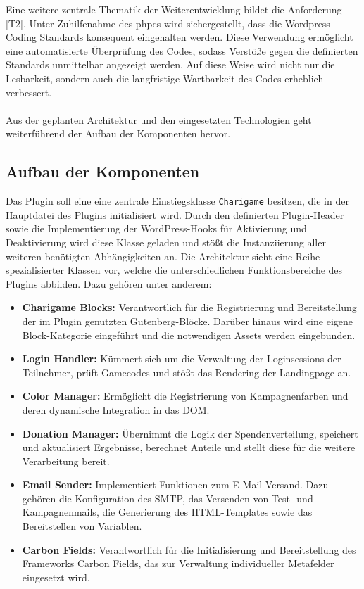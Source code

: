 Eine weitere zentrale Thematik der Weiterentwicklung bildet die Anforderung [T2].
Unter Zuhilfenahme des \gls{phpcs} wird sichergestellt, dass die Wordpress Coding Standards konsequent eingehalten werden.
Diese Verwendung ermöglicht eine automatisierte Überprüfung des Codes, sodass Verstöße gegen die definierten Standards unmittelbar angezeigt werden.
Auf diese Weise wird nicht nur die Lesbarkeit, sondern auch die langfristige Wartbarkeit des Codes erheblich verbessert.
\\\\
Aus der geplanten Architektur und den eingesetzten Technologien geht weiterführend der Aufbau der Komponenten hervor.

\subsection{Aufbau der Komponenten}
Das Plugin soll eine eine zentrale Einstiegsklasse \texttt{Charigame} besitzen, die in der Hauptdatei des Plugins initialisiert wird.
Durch den definierten Plugin-Header sowie die Implementierung der WordPress-Hooks für Aktivierung und Deaktivierung wird diese Klasse geladen und stößt die Instanziierung aller weiteren benötigten Abhängigkeiten an.
Die Architektur sieht eine Reihe spezialisierter Klassen vor, welche die unterschiedlichen Funktionsbereiche des Plugins abbilden.
Dazu gehören unter anderem:

\begin{itemize}
    \item \textbf{Charigame Blocks:} Verantwortlich für die Registrierung und Bereitstellung der im Plugin genutzten Gutenberg-Blöcke. Darüber hinaus wird eine eigene Block-Kategorie eingeführt und die notwendigen Assets werden eingebunden.
    \item \textbf{Login Handler:} Kümmert sich um die Verwaltung der Loginsessions der Teilnehmer, prüft Gamecodes und stößt das Rendering der Landingpage an.
    \item \textbf{Color Manager:} Ermöglicht die Registrierung von Kampagnenfarben und deren dynamische Integration in das DOM.
    \item \textbf{Donation Manager:} Übernimmt die Logik der Spendenverteilung, speichert und aktualisiert Ergebnisse, berechnet Anteile und stellt diese für die weitere Verarbeitung bereit.
    \item \textbf{Email Sender:} Implementiert Funktionen zum E-Mail-Versand. Dazu gehören die Konfiguration des SMTP, das Versenden von Test- und Kampagnenmails, die Generierung des HTML-Templates sowie das Bereitstellen von Variablen.
    \item \textbf{Carbon Fields:} Verantwortlich für die Initialisierung und Bereitstellung des Frameworks Carbon Fields, das zur Verwaltung individueller Metafelder eingesetzt wird.
\end{itemize}

